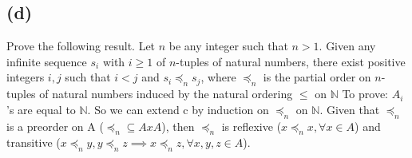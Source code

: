 \documentclass[12pt]{article}
\begin{document}
\subsection*{(d)}
Prove the following result.
\newline
Let $n$ be any  integer such that $n>1$.
Given any infinite sequence $s_i$ with $i \ge 1$ of $n$-tuples of
natural numbers, there exist positive integers $i, j$ such that
$i<j$ and $s_{i}\preceq_{n} s_{j}$, where $\preceq_{n}$ is the
partial order on $n$-tuples of natural numbers
induced by the natural ordering $\le$ on $\mathbb{N}$
To prove: $A_i$'s are equal to $\mathbb{N}$.
So we can extend c by induction on $\preceq_{n}$ on $\mathbb{N}$.
Given that $\preceq_{n}$ is a preorder on A ($\preceq_{n} \subseteq AxA$),
then $\preceq_{n}$ is reflexive ($ x \preceq_{n} x,\forall x \in A$)
and transitive ($x \preceq_{n} y, y \preceq_{n} z \implies x \preceq_{n} z,
\forall x,y,z \in A$).
\end{document}
